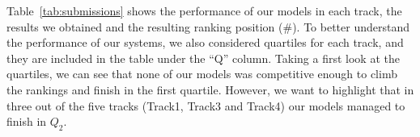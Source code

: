 \documentclass[11pt]{article}
\begin{document}
Table~\ref{tab:submissions} shows the performance of our models in each track, the results we obtained and the resulting ranking position (\#).
To better understand the performance of our systems, we also considered quartiles for each track, and they are included in the table under the ``Q'' column.
Taking a first look at the quartiles, we can see that none of our models was competitive enough to climb the rankings and finish in the first quartile.
However, we want to highlight that in three out of the five tracks (Track1, Track3 and Track4) our models managed to finish in $Q_2$.









\end{document}

